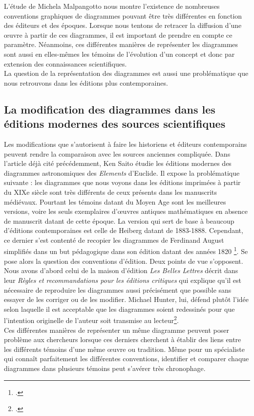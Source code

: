 L'étude de Michela Malpangotto nous montre l'existence de nombreuses conventions graphiques de diagrammes pouvant être très différentes en fonction des éditeurs et des époques. Lorsque nous tentons de retracer la diffusion d'une œuvre à partir de ces diagrammes, il est important de prendre en compte ce paramètre. Néanmoins, ces différentes manières de représenter les diagrammes sont aussi en elles-mêmes les témoins de l'évolution d'un concept et donc par extension des connaissances scientifiques. \\

La question de la représentation des diagrammes est aussi une problématique que nous retrouvons dans les éditions plus contemporaines. 

\subsection{La modification des diagrammes dans les éditions modernes des sources scientifiques}

Les modifications que s'autorisent à faire les historiens et éditeurs contemporains peuvent rendre la comparaison avec les sources anciennes compliquée. Dans l'article déjà cité précédemment, Ken Saito étudie les éditions modernes des diagrammes astronomiques des \textit{Elements} d'Euclide. Il expose la problématique suivante : les diagrammes que nous voyons dans les éditions imprimées à partir du XIXe siècle sont très différents de ceux présents dans les manuscrits médiévaux. Pourtant les témoins datant du Moyen Age sont les meilleures versions, voire les seuls exemplaires d'œuvres antiques mathématiques en absence de manuscrit datant de cette époque. La version qui sert de base à beaucoup d'éditions contemporaines est celle de Heiberg datant de 1883-1888. Cependant, ce dernier s'est contenté de recopier les diagrammes de Ferdinand August simplifiés dans un but pédagogique dans son édition datant des années 1820 \footcite{saitoTraditionsDiagramTradition2012}. Se pose alors la question des conventions d'édition. Deux points de vue s'opposent. Nous avons d'abord celui de la maison d'édition \textit{Les Belles Lettres} décrit dans leur \textit{Règles et recommandations pour les éditions critiques} qui explique qu'il est nécessaire de reproduire les diagrammes aussi précisément que possible sans essayer de les corriger ou de les modifier. Michael Hunter, lui, défend plutôt l'idée selon laquelle il est acceptable que les diagrammes soient redessinés pour que l'intention originelle de l'auteur soit transmise au lecteur\footcite{jardineCriticalEditingEarlyModern2010}.\\

Ces différentes manières de représenter un même diagramme peuvent poser problème aux chercheurs lorsque ces derniers cherchent à établir des liens entre les différents témoins d'une même œuvre ou tradition. Même pour un spécialiste qui connaît parfaitement les différentes conventions, identifier et comparer chaque diagrammes dans plusieurs témoins peut s'avérer très chronophage.